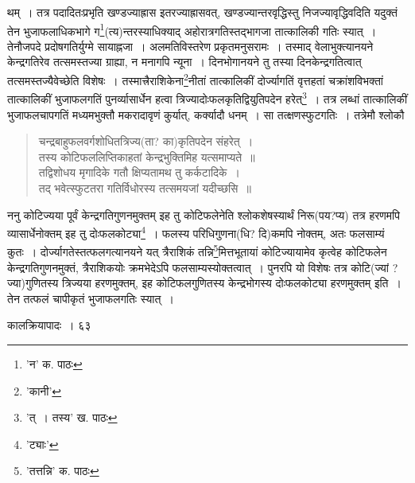 \documentclass[11pt, openany]{book}
\begin{document}
{{{{\vspace{0.3cm}
\noindent थम्~। तत्र पदादितःप्रभृति खण्डज्याह्रास इतरज्याह्रासवत्, खण्डज्यान्तरवृद्धिस्तु निजज्यावृद्धिवदिति यदुक्तं तेन भुजाफलाधिकभागे ग\renewcommand{\thefootnote}{१}\footnote{'न' क. पाठः}(त्य)न्तरस्याधिक्याद् अहोरात्रगतिस्तद्भागजा तात्कालिकी गतिः स्यात्~। तेनौजपदे प्रदोषगतिर्युग्मे सायाह्नजा~। अलमतिविस्तरेण प्रकृतमनुसरामः~। तस्माद् वेलाभुक्त्यानयने केन्द्रगतिरेव तत्समस्तज्या ग्राह्या, न मनागपि न्यूना~। दिनभोगानयने तु तस्या दिनकेन्द्रगतित्वात् तत्समस्तज्यैवेच्छेति
विशेषः~। तस्मात्त्रैराशिकेना\renewcommand{\thefootnote}{२}\footnote{'कानी'}नीतां तात्कालिकीं दोर्ज्यागतिं
वृत्तहतां चक्रांशविभक्तां तात्कालिकीं भुजाफलगतिं पुनर्व्यासार्धेन हत्वा त्रिज्यादोःफलकृतिद्वियुतिपदेन हरेत्\renewcommand{\thefootnote}{३}\footnote{'त्~। तस्य' ख. पाठः}~। तत्र लब्धां तात्कालिकीं भुजाफलचापगतिं मध्यमभुक्तौ मकरादावृणं कुर्यात्, कर्क्यादौ धनम्~। सा तत्क्षणस्फुटगतिः~। तत्रेमौ श्लोकौ\textendash 

\begin{quote}
{\qt चन्द्रबाहुफलवर्गशोधितत्रिज्य(ता? का)कृतिपदेन संहरेत्~।\\
तस्य कोटिफललिप्तिकाहतां केन्द्रभुक्तिमिह यत्समाप्यते~॥\\
तद्विशोधय मृगादिके गतौ क्षिप्यतामथ तु कर्कटादिके~।\\
तद् भवेत्स्फुटतरा गतिर्विधोरस्य तत्समयजां यदीच्छसि~॥}
\end{quote}

\noindent ननु कोटिज्यया पूर्वं केन्द्रगतिगुणनमुक्तम् इह तु कोटिफलेनेति श्लोकशेषस्यार्थं निरू(पय?प्य) तत्र हरणमपि व्यासार्धेनोक्तम् इह तु दोःफलकोट्या\renewcommand{\thefootnote}{४}\footnote{'ट्याः'}~। फलस्य परिधिगुणना(धि? दि)कमपि नोक्तम्, अतः फलसाम्यं कुतः~। दोर्ज्यागतेस्तत्फलगत्यानयने यत् त्रैराशिकं तन्नि\renewcommand{\thefootnote}{५}\footnote{'तत्तन्नि' क. पाठः}मित्तभूतायां
कोटिज्यायामेव कृत्वेह कोटिफलेन केन्द्रगतिगुणनमुक्तं, त्रैराशिकयोः क्रमभेदेऽपि फलसाम्यस्योक्तत्वात्~। पुनरपि यो विशेषः तत्र कोटि(ज्यां ? ज्या)गुणितस्य त्रिज्यया हरणमुक्तम्, इह कोटिफलगुणितस्य केन्द्रभोगस्य दोःफलकोट्या हरणमुक्तम् इति~। तेन तत्फलं चापीकृतं भुजाफलगतिः स्यात्~। 

\newpage

\vspace{3cm} \hspace{4cm} कालक्रियापादः~।\hspace{4cm} ६३ 

}}}}
\end{document}
